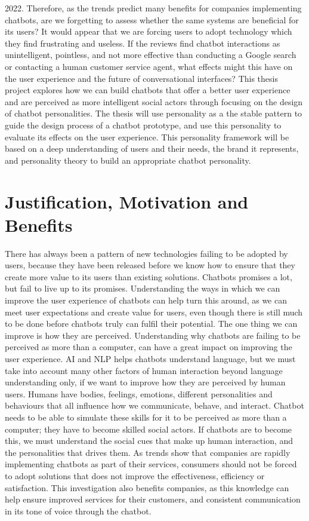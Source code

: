 2022. Therefore, as the trends predict many benefits for companies implementing chatbots, are we forgetting to assess whether the same systems are beneficial for its users? It would appear that we are forcing users to adopt technology which they find frustrating and useless. If the reviews find chatbot interactions as unintelligent, pointless, and not more effective than conducting a Google search or contacting a human customer service agent, what effects might this have on the user experience and the future of conversational interfaces?
This thesis project explores how we can build chatbots that offer a better user experience and are perceived as more intelligent social actors through focusing on the design of chatbot personalities. The thesis will use personality as a the stable pattern to guide the design process of a chatbot prototype, and use this personality to evaluate its effects on the user experience. This personality framework will be based on a deep understanding of users and their needs, the brand it represents, and personality theory to build an appropriate chatbot personality.

\vspace{5mm} %

\section{Justification, Motivation and Benefits}
There has always been a pattern of new technologies failing to be adopted by users, because they have been released before we know how to ensure that they create more value to its users than existing solutions. Chatbots promises a lot, but fail to live up to its promises. Understanding the ways in which we can improve the user experience of chatbots can help turn this around, as we can meet user expectations and create value for users, even though there is still much to be done before chatbots truly can fulfil their potential. The one thing we can improve is how they are perceived. Understanding why chatbots are failing to be perceived as more than a computer, can have a great impact on improving the user experience. AI and NLP helps chatbots understand language, but we must take into account many other factors of human interaction beyond language understanding only, if we want to improve how they are perceived by human users. Humans have bodies, feelings, emotions, different personalities and behaviours that all influence how we communicate, behave, and interact. Chatbot needs to be able to simulate these skills for it to be perceived as more than a computer; they have to become skilled social actors. If chatbots are to become this, we must understand the social cues that make up human interaction, and the personalities that drives them. As trends show that companies are rapidly implementing chatbots as part of their services, consumers should not be forced to adopt solutions that does not improve the effectiveness, efficiency or satisfaction. This investigation also benefits companies, as this knowledge can help ensure improved services for their customers, and consistent communication in its tone of voice through the chatbot.

